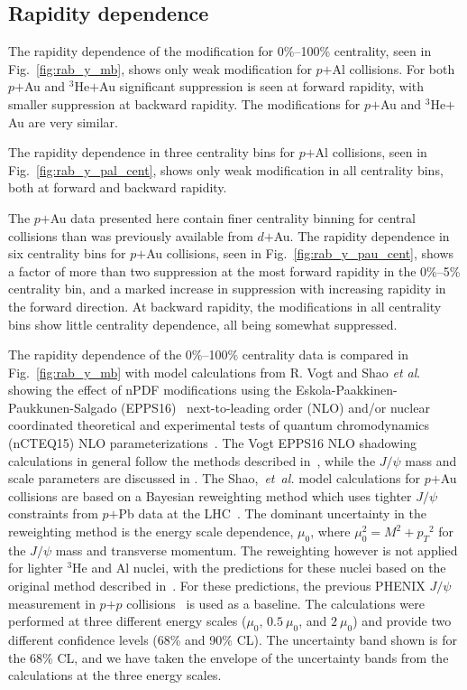 \documentclass[twocolumn,letterpaper,aps,prc,longbibliography,superscriptaddress,nofootinbib,floatfix]{revtex4-1}
\newcommand{\pt}{\mbox{$p_T$}\xspace}
\newcommand{\pp}{\mbox{$p$$+$$p$}\xspace}
\newcommand{\dau}{\mbox{$d$$+$Au}\xspace}
\newcommand{\pau}{\mbox{$p$$+$Au}\xspace}
\newcommand{\pal}{\mbox{$p$$+$Al}\xspace}
\newcommand{\ppb}{\mbox{$p$$+$Pb}\xspace}
\newcommand{\heau}{\mbox{$^{3}$He$+$Au}\xspace}
\newcommand{\jpsi}{\mbox{$J/\psi$}\xspace}
\begin{document}
\subsection{Rapidity dependence}

The rapidity dependence of the modification for 0\%--100\% centrality, 
seen in Fig.~\ref{fig:rab_y_mb}, shows only weak modification for \pal 
collisions. For both \pau and \heau significant suppression is seen at 
forward rapidity, with smaller suppression at backward rapidity. The 
modifications for \pau and \heau are very similar.

The rapidity dependence in three centrality bins for \pal collisions, 
seen in Fig.~\ref{fig:rab_y_pal_cent}, shows only weak modification in 
all centrality bins, both at forward and backward rapidity.

The \pau data presented here contain finer centrality binning for 
central collisions than was previously available from \dau. The rapidity 
dependence in six centrality bins for \pau collisions, seen in 
Fig.~\ref{fig:rab_y_pau_cent}, shows a factor of more than two 
suppression at the most forward rapidity in the 0\%--5\% centrality bin, 
and a marked increase in suppression with increasing rapidity in the 
forward direction. At backward rapidity, the modifications in all 
centrality bins show little centrality dependence, all being somewhat 
suppressed.

The rapidity dependence of the 0\%--100\% centrality data is compared in 
Fig.~\ref{fig:rab_y_mb} with model calculations from R. Vogt 
\cite{Vogt:2015uba,Nelson:2012bc} and Shao \textit{et al}. 
\cite{Kusina:2017gkz,Shao:2012iz,Shao:2015vga,Lansberg:2016deg} showing the 
effect of nPDF modifications using the Eskola-Paakkinen-Paukkunen-Salgado 
(EPPS16)~\cite{Eskola:2016oht} next-to-leading order (NLO) and/or nuclear 
coordinated theoretical and experimental tests of quantum chromodynamics 
(nCTEQ15) NLO parameterizations~\cite{Kovarik:2015cma}. The Vogt EPPS16 NLO 
shadowing calculations in general follow the methods described 
in~\cite{Vogt:2015uba}, while the \jpsi mass and scale parameters are 
discussed in \cite{Nelson:2012bc}.  The Shao,~\textit{et~al.} model 
calculations for \pau collisions are based on a Bayesian reweighting method 
which uses tighter \jpsi constraints from \ppb data at the 
LHC~\cite{Kusina:2017gkz}. The dominant uncertainty in the reweighting 
method is the energy scale dependence, $\mu_0$, where $\mu_0^2 = M^2 + 
\pt^2$ for the \jpsi mass and transverse momentum. The reweighting however 
is not applied for lighter $^3$He and Al nuclei, with the predictions for 
these nuclei based on the original method described 
in~\cite{Shao:2012iz,Shao:2015vga,Lansberg:2016deg}. For these predictions, 
the previous PHENIX \jpsi measurement in \pp collisions~\cite{Adare:2011vq} 
is used as a baseline. The calculations were performed at three different 
energy scales ($\mu_{0}$, $0.5~\mu_{0}$, and $2~\mu_{0}$) and provide two 
different confidence levels (68\% and 90\% CL). The uncertainty band shown 
is for the 68\% CL, and we have taken the envelope of the uncertainty bands 
from the calculations at the three energy scales.
\end{document}
